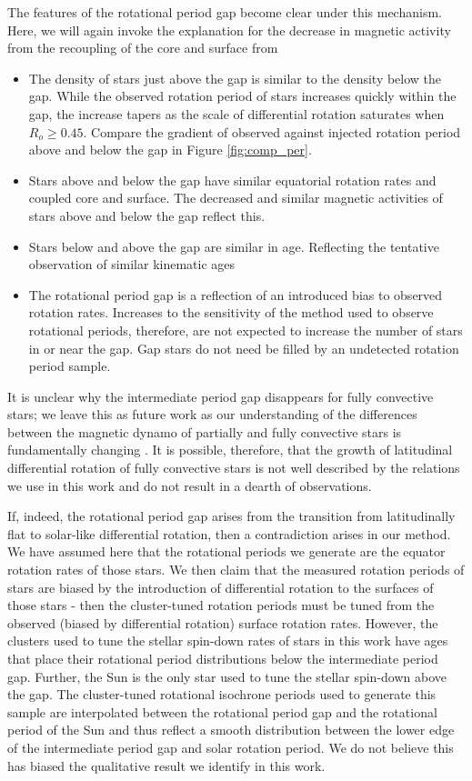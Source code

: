 The features of the rotational period gap become clear under this mechanism.
Here, we will again invoke the explanation for the decrease in magnetic activity from the recoupling of the core and surface from \citep{cao_core-envelope_2023}
\begin{itemize}
	\item The density of stars just above the gap is similar to the density below the gap. While the observed rotation period of stars increases quickly within the gap, the increase tapers as the scale of differential rotation saturates when $R_o\geq0.45$. Compare the gradient of observed against injected rotation period above and below the gap in Figure \ref{fig:comp_per}.
	\item Stars above and below the gap have similar equatorial rotation rates and coupled core and surface. The decreased and similar magnetic activities of stars above and below the gap reflect this.
	\item Stars below and above the gap are similar in age. Reflecting the tentative observation of similar kinematic ages \citep{lu_bridging_2022}
	\item The rotational period gap is a reflection of an introduced bias to observed rotation rates. Increases to the sensitivity of the method used to observe rotational periods, therefore, are not expected to increase the number of stars in or near the gap. Gap stars do not need be filled by an undetected rotation period sample.
\end{itemize}
It is unclear why the intermediate period gap disappears for fully convective stars; we leave this as future work as our understanding of the differences between the magnetic dynamo of partially and fully convective stars is fundamentally changing \citet{lu_abrupt_2023}.
It is possible, therefore, that the growth of latitudinal differential rotation of fully convective stars is not well described by the relations we use in this work and do not result in a dearth of observations.

If, indeed, the rotational period gap arises from the transition from latitudinally flat to solar-like differential rotation, then a contradiction arises in our method.
We have assumed here that the rotational periods we generate are the equator rotation rates of those stars.
We then claim that the measured rotation periods of stars are biased by the introduction of differential rotation to the surfaces of those stars - then the cluster-tuned rotation periods must be tuned from the observed (biased by differential rotation) surface rotation rates.
However, the clusters used to tune the stellar spin-down rates of stars in this work have ages that place their rotational period distributions below the intermediate period gap.
 Further, the Sun is the only star used to tune the stellar spin-down above the gap.
The cluster-tuned rotational isochrone periods used to generate this sample are interpolated between the rotational period gap and the rotational period of the Sun and thus reflect a smooth distribution between the lower edge of the intermediate period gap and solar rotation period.
We do not believe this has biased the qualitative result we identify in this work.

